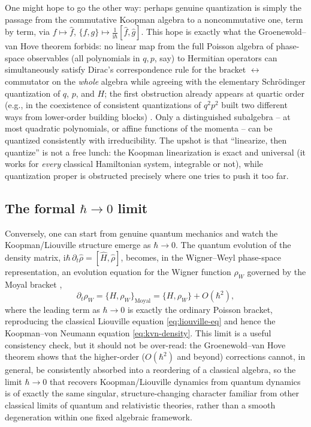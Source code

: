 \documentclass[11pt]{article}
\theoremstyle{remark}
\newcommand{\PB}[2]{\{#1,#2\}}
\newcommand{\ii}{\mathrm{i}}
\begin{document}
One might hope to go the other way: perhaps genuine quantization is simply the passage from the commutative Koopman algebra to a noncommutative one, term by term, via $f\mapsto\hat f$, $\PB{f}{g}\mapsto \frac{1}{\ii\hbar}[\hat f,\hat g]$. This hope is exactly what the Groenewold--van Hove theorem forbids: no linear map from the full Poisson algebra of phase-space observables (all polynomials in $q,p$, say) to Hermitian operators can simultaneously satisfy Dirac's correspondence rule for the bracket $\leftrightarrow$ commutator on the \emph{whole} algebra while agreeing with the elementary Schr\"odinger quantization of $q$, $p$, and $H$; the first obstruction already appears at quartic order (e.g., in the coexistence of consistent quantizations of $q^2p^2$ built two different ways from lower-order building blocks) \cite{Groenewold1946,vanHove1951}. Only a distinguished subalgebra -- at most quadratic polynomials, or affine functions of the momenta -- can be quantized consistently with irreducibility. The upshot is that ``linearize, then quantize'' is not a free lunch: the Koopman linearization is exact and universal (it works for \emph{every} classical Hamiltonian system, integrable or not), while quantization proper is obstructed precisely where one tries to push it too far.

\subsection{The formal $\hbar\to0$ limit}

Conversely, one can start from genuine quantum mechanics and watch the Koopman/Liouville structure emerge as $\hbar\to0$. The quantum evolution of the density matrix, $\ii\hbar\,\partial_t\hat\rho = [\hat H,\hat\rho]$, becomes, in the Wigner--Weyl phase-space representation, an evolution equation for the Wigner function $\rho_W$ governed by the Moyal bracket \cite{Wigner1932,Moyal1949},
\begin{equation}
\partial_t\rho_W = \PB{H}{\rho_W}_{\mathrm{Moyal}} = \PB{H}{\rho_W} + O(\hbar^2),
\end{equation}
where the leading term as $\hbar\to0$ is exactly the ordinary Poisson bracket, reproducing the classical Liouville equation \eqref{eq:liouville-eq} and hence the Koopman--von Neumann equation \eqref{eq:kvn-density}. This limit is a useful consistency check, but it should not be over-read: the Groenewold--van Hove theorem shows that the higher-order ($O(\hbar^2)$ and beyond) corrections cannot, in general, be consistently absorbed into a reordering of a classical algebra, so the limit $\hbar\to0$ that recovers Koopman/Liouville dynamics from quantum dynamics is of exactly the same singular, structure-changing character familiar from other classical limits of quantum and relativistic theories, rather than a smooth degeneration within one fixed algebraic framework.
\end{document}

